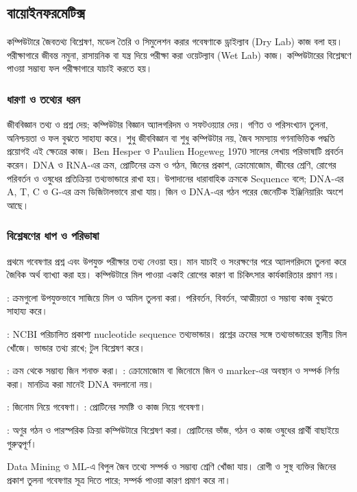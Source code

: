 \subsection{বায়োইনফরমেটিক্স}
\label{sec:ch1-bioinformatics}
কম্পিউটারে জৈবতথ্য বিশ্লেষণ, মডেল তৈরি ও সিমুলেশন করার গবেষণাকে ড্রাইল্যাব (Dry Lab) কাজ বলা হয়। পরীক্ষাগারে জীবন্ত নমুনা, রাসায়নিক বা যন্ত্র দিয়ে পরীক্ষা করা ওয়েটল্যাব (Wet Lab) কাজ। কম্পিউটারের বিশ্লেষণে পাওয়া সম্ভাব্য ফল পরীক্ষাগারে যাচাই করতে হয়।
\subsubsection{ধারণা ও তথ্যের ধরন}
জীববিজ্ঞান তথ্য ও প্রশ্ন দেয়; কম্পিউটার বিজ্ঞান অ্যালগরিদম ও সফটওয়্যার দেয়। গণিত ও পরিসংখ্যান তুলনা, অনিশ্চয়তা ও ফল বুঝতে সাহায্য করে। শুধু জীববিজ্ঞান বা শুধু কম্পিউটার নয়, জৈব সমস্যায় গণনাভিত্তিক পদ্ধতি প্রয়োগই এই ক্ষেত্রের কাজ। Ben Hesper ও Paulien Hogeweg 1970 সালের লেখায় পরিভাষাটি প্রবর্তন করেন।
DNA ও RNA-এর ক্রম, প্রোটিনের ক্রম ও গঠন, জিনের প্রকাশ, ক্রোমোজোম, জীবের শ্রেণি, রোগের পরিবর্তন ও ওষুধের প্রতিক্রিয়া তথ্যভান্ডারে রাখা হয়। উপাদানের ধারাবাহিক ক্রমকে Sequence বলে; DNA-এর A, T, C ও G-এর ক্রম ডিজিটালভাবে রাখা যায়। জিন ও DNA-এর গঠন পরের জেনেটিক ইঞ্জিনিয়ারিং অংশে আছে।
\subsubsection{বিশ্লেষণের ধাপ ও পরিভাষা}
প্রথমে গবেষণার প্রশ্ন এবং উপযুক্ত পরীক্ষার তথ্য নেওয়া হয়। মান যাচাই ও সংরক্ষণের পরে অ্যালগরিদমে তুলনা করে জৈবিক অর্থ ব্যাখ্যা করা হয়। কম্পিউটারে মিল পাওয়া একাই রোগের কারণ বা চিকিৎসার কার্যকারিতার প্রমাণ নয়।
\begin{compactpoints}
\item {}: ক্রমগুলো উপযুক্তভাবে সাজিয়ে মিল ও অমিল তুলনা করা। পরিবর্তন, বিবর্তন, আত্মীয়তা ও সম্ভাব্য কাজ বুঝতে সাহায্য করে।
\item {}: NCBI পরিচালিত প্রকাশ্য nucleotide sequence তথ্যভান্ডার।  প্রশ্নের ক্রমের সঙ্গে তথ্যভান্ডারের স্থানীয় মিল খোঁজে। ভান্ডার তথ্য রাখে; টুল বিশ্লেষণ করে।
\item {}: ক্রম থেকে সম্ভাব্য জিন শনাক্ত করা। : ক্রোমোজোম বা জিনোমে জিন ও marker-এর অবস্থান ও সম্পর্ক নির্ণয় করা। মানচিত্র করা মানেই DNA বদলানো নয়।
\item {}: জিনোম নিয়ে গবেষণা। : প্রোটিনের সমষ্টি ও কাজ নিয়ে গবেষণা।
\item {}: অণুর গঠন ও পারস্পরিক ক্রিয়া কম্পিউটারে বিশ্লেষণ করা। প্রোটিনের ভাঁজ, গঠন ও কাজ ওষুধের প্রার্থী বাছাইয়ে গুরুত্বপূর্ণ।
\item Data Mining ও ML-এ বিপুল জৈব তথ্যে সম্পর্ক ও সম্ভাব্য শ্রেণি খোঁজা যায়। রোগী ও সুস্থ ব্যক্তির জিনের প্রকাশ তুলনা গবেষণার সূত্র দিতে পারে; সম্পর্ক পাওয়া কারণ প্রমাণ করে না।
\end{compactpoints}
